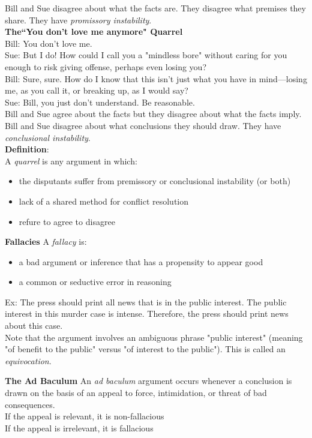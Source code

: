 Bill and Sue disagree about what the facts are. They disagree what premises they share. They have \textit{promissory instability}.\\

\textbf{The``You don't love me anymore" Quarrel}\\
Bill: You don't love me.\\
Sue: But I do! How could I call you a "mindless bore" without caring for you enough to risk giving offense, perhaps even losing you?\\
Bill: Sure, sure. How do I know that this isn't just what you have in mind—losing me, as you call it, or breaking up, as I would say?\\
Sue: Bill, you just don't understand. Be reasonable.\\

Bill and Sue agree about the facts but they disagree about what the facts imply. Bill and Sue disagree about what conclusions they should draw. They have \textit{conclusional instability}.\\

\textbf{Definition}:\\
A \textit{quarrel} is any argument in which:
\begin{itemize}
    \item the disputants suffer from premissory or conclusional instability (or both)
    \item lack of a shared method for conflict resolution
    \item refure to agree to disagree
\end{itemize}

\textbf{Fallacies}
A \textit{fallacy} is:
\begin{itemize}
    \item a bad argument or inference that has a propensity to appear good
    \item a common or seductive error in reasoning
\end{itemize}
Ex: The press should print all news that is in the public interest. The public interest in this murder case is intense. Therefore, the press should print news about this case.\\

Note that the argument involves an ambiguous phrase "public interest" (meaning "of benefit to the public" versus "of interest to the public"). This is called an \textit{equivocation}.

\textbf{The Ad Baculum}
An \textit{ad baculum} argument occurs whenever a conclusion is drawn on the basis of an appeal to force, intimidation, or threat of bad consequences.\\
If the appeal is relevant, it is non-fallacious\\
If the appeal is irrelevant, it is fallacious\\

